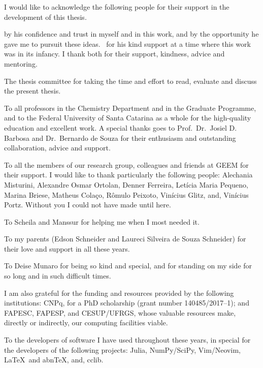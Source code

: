 \begin{agradecimentos}[Acknowledgements]
I would like to acknowledge the following people for their support in the
development of this thesis.

\imprimirorientador{} by his confidence and trust in myself and in this work, and by the
opportunity he gave me to pursuit these ideas.
\imprimircoorientador\ for his kind support at a time where this work was in its
infancy.
I thank both for their support, kindness, advice and mentoring.

The thesis committee for taking the time and effort to read, evaluate and
discuss the present thesis.

To all professors in the Chemistry Department and in the Graduate Programme, and to the Federal University of
Santa Catarina as a whole
for the high-quality education and excellent work.
A special thanks goes to Prof.\ Dr.\ Josiel D. Barbosa and
Dr.\ Bernardo de Souza
for their enthusiasm and outstanding collaboration, advice and support.

To all the members of our research group, colleagues and friends at GEEM for
their support.
I would like to thank particularly the following people:
Alechania Misturini,
Alexandre Osmar Ortolan,
Denner Ferreira,
Letícia Maria Pequeno,
Marina Briese,
Matheus Colaço,
Rômulo Peixoto,
Vinícius Glitz,
and,
Vinícius Portz.
Without you I could not have made until here.

To Scheila and Manssur for helping me when I most needed it.

To my parents (Edson Schneider and Laureci Silveira de Souza Schneider)
for their love and support in all these years.

To Deise Munaro for being so kind and special,
and for standing on my side for so long and in such difficult times.

I am also grateful for the funding and resources provided by the following institutions:
CNPq, for a PhD scholarship (grant number 140485/2017--1);
and FAPESC, FAPESP, and CESUP/UFRGS, whose valuable resources make, directly or
indirectly, our computing facilities
viable.

To the developers of software I have used throughout these years, in special for
the developers of the following projects:
Julia,
NumPy/SciPy,
Vim/Neovim,
\LaTeX\ and abn\TeX{},
and,
cclib.

\end{agradecimentos}
